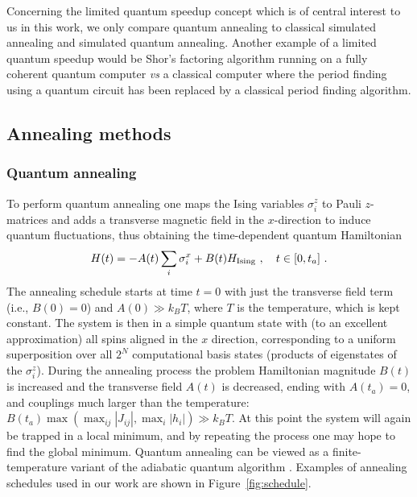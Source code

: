 Concerning the limited quantum speedup concept which is of central interest to us in this work, we only compare quantum annealing  to classical simulated annealing and simulated quantum annealing. Another example of a limited quantum speedup would be Shor's factoring algorithm running on a fully coherent quantum computer \textit{vs} a classical computer where the period finding using a quantum circuit has been replaced by a classical period finding algorithm.



\subsection{Annealing methods}
\subsubsection{Quantum annealing}
To perform quantum annealing one maps the Ising variables $\sigma_i^z$ to Pauli $z$-matrices and adds a transverse magnetic field in the $x$-direction to induce quantum fluctuations, thus obtaining the time-dependent quantum Hamiltonian
\begin{equation}
\label{eq:Hquantum}
H(t) = -A(t) \sum_i \sigma_i^x +B(t) H_{\rm Ising}\ , \quad t\in[0,t_a]\ .
\end{equation}
The annealing schedule starts at time $t=0$ with just the transverse field term (i.e., $B(0)=0$) and $A(0)\gg k_B T$, where $T$ is the temperature, which is kept constant. The system is then in a simple quantum state with (to an excellent approximation) all spins aligned in the $x$ direction, corresponding to a uniform superposition over all $2^N$ computational basis states (products of eigenstates of the $\sigma_i^z$). During the annealing process the problem Hamiltonian magnitude $B(t)$ is increased and the transverse field $A(t)$ is decreased, ending with $A(t_a)=0$, and couplings much larger than the temperature: $B(t_a) \max(\max_{ij}|J_{ij}|,\max_i|h_i|) \gg k_BT$.
At this point the system will again be trapped in a local minimum, and by repeating the process one may hope to find the global minimum. Quantum annealing can be viewed as a finite-temperature variant of the adiabatic quantum algorithm \cite{farhi}. Examples of annealing schedules used in our work are shown in Figure~\ref{fig:schedule}.\\

